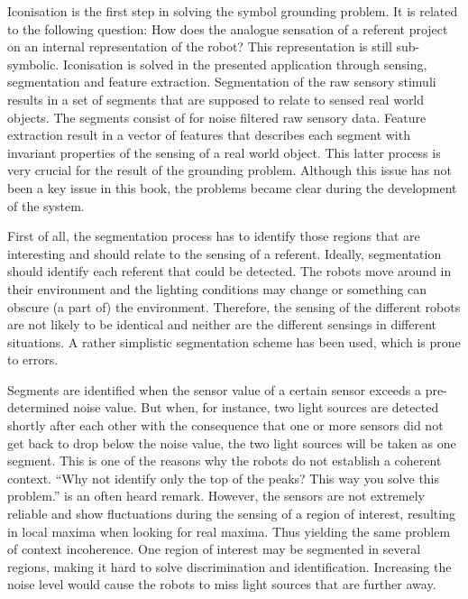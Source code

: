 Iconisation is the first step in solving the symbol grounding problem. It is related to the following question: How does the analogue sensation of a referent project on an internal representation of the robot? This representation is still sub-symbolic. Iconisation is solved in the presented application through sensing, segmentation and feature extraction. Segmentation of the raw sensory stimuli results in a set of segments that are supposed to relate to sensed real world objects. The segments consist of for noise filtered raw sensory data. Feature extraction result in a vector of features that describes each segment with invariant properties of the sensing of a real world object. This latter process is very crucial for the result of the grounding problem. Although this issue has not been a key issue in this book, the problems became clear during the development of the system. 

First of all, the segmentation process has to identify those regions that are interesting and should relate to the sensing of a referent. Ideally, segmentation should identify each referent that could be detected. The robots move around in their environment and the lighting conditions may change or something can obscure (a part of) the environment. Therefore, the sensing of the different robots are not likely to be identical and neither are the different sensings in different situations. A rather simplistic segmentation scheme has been used, which is prone to errors. 

Segments are identified when the sensor value of a certain sensor exceeds a pre-determined noise value. But when, for instance, two light sources are detected shortly after each other with the consequence that one or more sensors did not get back to drop below the noise value, the two light sources will be taken as one segment. This is one of the reasons why the robots do not establish a coherent context. ``Why not identify only the top of the peaks? This way you solve this problem.'' is an often heard remark. However, the sensors are not extremely reliable and show fluctuations during the sensing of a region of interest, resulting in local maxima when looking for real maxima. Thus yielding the same problem of context incoherence. One region of interest may be segmented in several regions, making it hard to solve discrimination and identification. Increasing the noise level would cause the robots to miss light sources that are further away.

